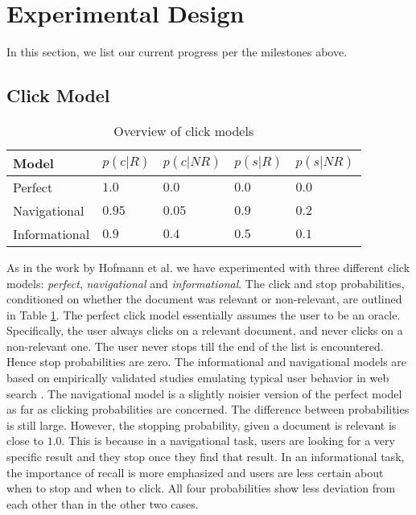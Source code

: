 \documentclass{acm_proc_article-sp}
\begin{document}
\section{Experimental Design}
In this section, we list our current progress per the milestones above. 

\subsection{Click Model}
\begin{table}
\caption{Overview of click models}
    \begin{tabular}[t]{ |p{2.0cm} | p{1.3cm} | p{1.3cm} | p{1.3cm} | p{1.3cm} |}
    \hline
    Model & $p(c|R)$ & $p(c|NR)$ & $p(s|R)$ & $p(s|NR)$ \\ \hline
    Perfect & $1.0$ & $0.0$ & $0.0$ & $0.0$  \\ \hline
Navigational & $0.95$ & $0.05$ & $0.9$ & $0.2$   \\ \hline
Informational & $0.9$ & $0.4$ & $0.5$ & $0.1$    \\ \hline
    \end{tabular}
\label{click}
\end{table}
As in the work by Hofmann et al. \cite{hofmann} we have experimented with three different click models: \emph{perfect}, \emph{navigational} and \emph{informational}. The click and stop probabilities, conditioned on whether the document was relevant or non-relevant, are outlined in Table \ref{click}. The perfect click model essentially assumes the user to be an oracle. Specifically, the user always clicks on a relevant document, and never clicks on a non-relevant one. The user never stops till the end of the list is encountered. Hence stop probabilities are zero. The informational and navigational models are based on empirically validated studies emulating typical user behavior in web search \cite{broder, guo1, guo2}. The navigational model is a slightly noisier version of the perfect model as far as clicking probabilities are concerned. The difference between probabilities is still large. However, the stopping probability, given a document is relevant is close to $1.0$. This is because in a navigational task, users are looking for a very specific result and they stop once they find that result. In an informational task, the importance of recall is more emphasized and users are less certain about when to stop and when to click. All four probabilities show less deviation from each other than in the other two cases.\\ \\
\end{document}
